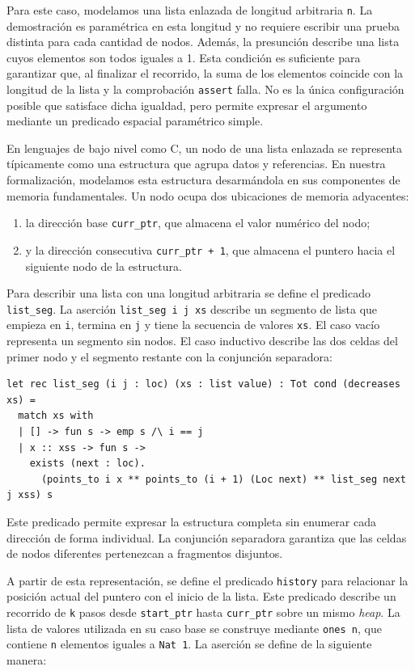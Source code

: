 \documentclass[a4paper,	11pt]{report}
\begin{document}
Para este caso,
modelamos una lista enlazada de longitud arbitraria \lstinline|n|.
La demostración es paramétrica en esta longitud y no requiere escribir una prueba distinta para cada cantidad de nodos.
Además,
la presunción describe una lista cuyos elementos son todos iguales a 1.
Esta condición es suficiente para garantizar que,
al finalizar el recorrido,
la suma de los elementos coincide con la longitud de la lista y la comprobación \lstinline|assert| falla.
No es la única configuración posible que satisface dicha igualdad,
pero permite expresar el argumento mediante un predicado espacial paramétrico simple.

En lenguajes de bajo nivel como C,
un nodo de una lista enlazada se representa típicamente como una estructura que agrupa datos y referencias.
En nuestra formalización,
modelamos esta estructura desarmándola en sus componentes de memoria fundamentales.
Un nodo ocupa dos ubicaciones de memoria adyacentes:
\begin{enumerate}
  \item la dirección base \lstinline|curr_ptr|,
  que almacena el valor numérico del nodo;
  \item y la dirección consecutiva \lstinline|curr_ptr + 1|,
  que almacena el puntero hacia el siguiente nodo de la estructura.
\end{enumerate}

Para describir una lista con una longitud arbitraria se define el predicado \lstinline|list_seg|.
La aserción \lstinline|list_seg i j xs| describe un segmento de lista que empieza en \lstinline|i|,
termina en \lstinline|j| y tiene la secuencia de valores \lstinline|xs|.
El caso vacío representa un segmento sin nodos.
El caso inductivo describe las dos celdas del primer nodo y el segmento restante con la conjunción separadora:

\begin{lstlisting}
let rec list_seg (i j : loc) (xs : list value) : Tot cond (decreases xs) =
  match xs with
  | [] -> fun s -> emp s /\ i == j
  | x :: xss -> fun s -> 
    exists (next : loc).
      (points_to i x ** points_to (i + 1) (Loc next) ** list_seg next j xss) s
\end{lstlisting}
Este predicado permite expresar la estructura completa sin enumerar cada dirección de forma individual.
La conjunción separadora garantiza que las celdas de nodos diferentes pertenezcan a fragmentos disjuntos.

A partir de esta representación,
se define el predicado \lstinline|history|
para relacionar la posición actual del puntero con el inicio de la lista.
Este predicado describe un recorrido de \lstinline|k| pasos desde \lstinline|start_ptr| hasta \lstinline|curr_ptr| sobre un mismo \emph{heap}.
La lista de valores utilizada en su caso base se construye mediante \lstinline|ones n|,
que contiene \lstinline|n| elementos iguales a \lstinline|Nat 1|.
La aserción se define de la siguiente manera:
\end{document}
